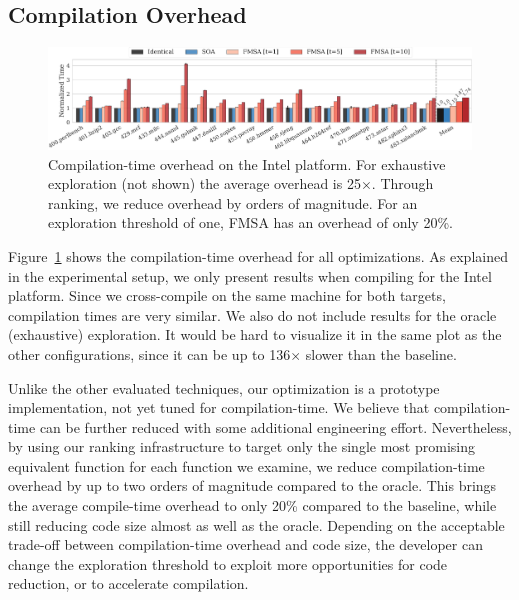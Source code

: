 \subsection{Compilation Overhead}

\begin{figure}[t]
  \centering
  \includegraphics[width=\linewidth]{figs/compilation-time.pdf}
	\caption{Compilation-time overhead on the Intel platform. For exhaustive exploration (not shown) the average overhead is 25$\times$. Through ranking, we reduce overhead by orders of magnitude. For an exploration threshold of one, FMSA has an overhead of only 20\%.}
  \label{fig:compilation-time}
\end{figure}

Figure~\ref{fig:compilation-time} shows the compilation-time overhead for all optimizations. As explained in the experimental setup, we
only present results when compiling for the Intel platform. Since we cross-compile on the same machine for both targets, compilation times
are very similar. We also do not include results for the oracle (exhaustive) exploration. It would be hard to visualize it in the same plot
as the other configurations, since it can be up to 136$\times$ slower than the baseline.

Unlike the other evaluated techniques, our optimization is a prototype implementation, not yet tuned for compilation-time. We believe that
compilation-time can be further reduced with some additional engineering effort. Nevertheless, by using our ranking infrastructure to
target only the single most promising equivalent function for each function we examine, we reduce compilation-time overhead by up to two
orders of magnitude compared to the oracle. This brings the average compile-time overhead to only 20\% compared to the baseline, while
still reducing code size almost as well as the oracle. Depending on the acceptable trade-off between compilation-time overhead and code
size, the developer can change the exploration threshold to exploit more opportunities for code reduction, or to accelerate compilation.

